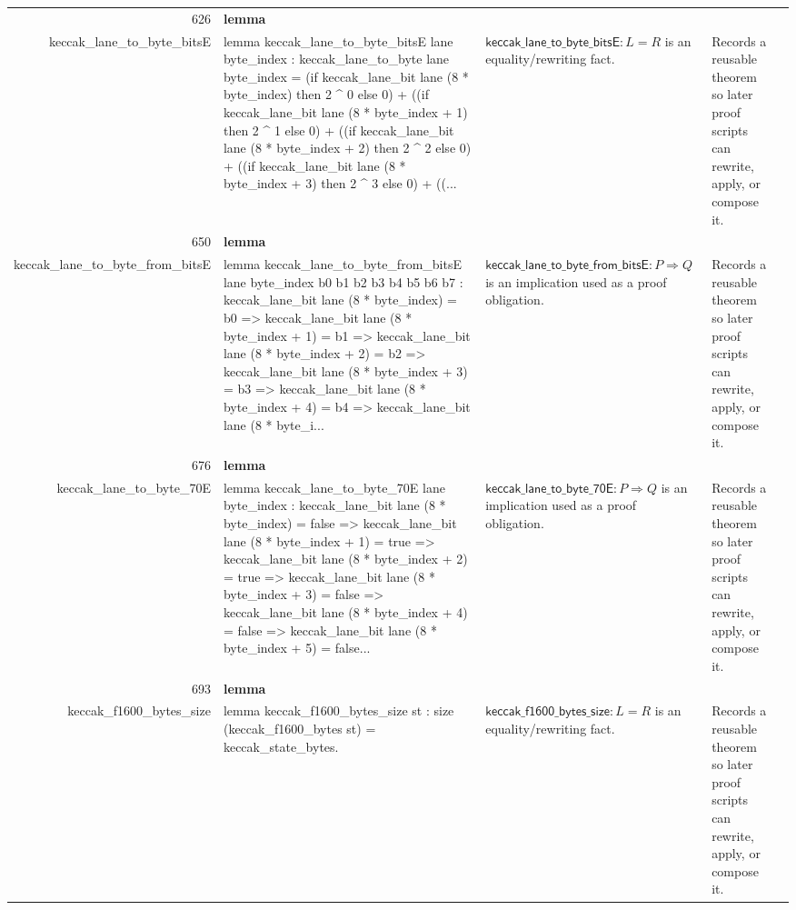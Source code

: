 \documentclass[10pt]{article}
\newcommand{\ec}[1]{\begingroup\ttfamily\scriptsize #1\endgroup}
\begin{document}
\begin{longtable}{r L{0.17\textwidth} L{0.26\textwidth} L{0.27\textwidth} L{0.20\textwidth}}
626 & \textbf{lemma}\\\ec{keccak\_lane\_to\_byte\_bitsE} & \ec{lemma keccak\_lane\_to\_byte\_bitsE lane byte\_index : keccak\_lane\_to\_byte lane byte\_index = (if keccak\_lane\_bit lane (8 * byte\_index) then 2 \textasciicircum{} 0 else 0) + ((if keccak\_lane\_bit lane (8 * byte\_index + 1) then 2 \textasciicircum{} 1 else 0) + ((if keccak\_lane\_bit lane (8 * byte\_index + 2) then 2 \textasciicircum{} 2 else 0) + ((if keccak\_lane\_bit lane (8 * byte\_index + 3) then 2 \textasciicircum{} 3 else 0) + ((...} & \(\mathsf{keccak\_lane\_to\_byte\_bitsE} : L = R\) is an equality/rewriting fact. & Records a reusable theorem so later proof scripts can rewrite, apply, or compose it. \\
650 & \textbf{lemma}\\\ec{keccak\_lane\_to\_byte\_from\_bitsE} & \ec{lemma keccak\_lane\_to\_byte\_from\_bitsE lane byte\_index b0 b1 b2 b3 b4 b5 b6 b7 : keccak\_lane\_bit lane (8 * byte\_index) = b0 => keccak\_lane\_bit lane (8 * byte\_index + 1) = b1 => keccak\_lane\_bit lane (8 * byte\_index + 2) = b2 => keccak\_lane\_bit lane (8 * byte\_index + 3) = b3 => keccak\_lane\_bit lane (8 * byte\_index + 4) = b4 => keccak\_lane\_bit lane (8 * byte\_i...} & \(\mathsf{keccak\_lane\_to\_byte\_from\_bitsE} : P \Rightarrow Q\) is an implication used as a proof obligation. & Records a reusable theorem so later proof scripts can rewrite, apply, or compose it. \\
676 & \textbf{lemma}\\\ec{keccak\_lane\_to\_byte\_70E} & \ec{lemma keccak\_lane\_to\_byte\_70E lane byte\_index : keccak\_lane\_bit lane (8 * byte\_index) = false => keccak\_lane\_bit lane (8 * byte\_index + 1) = true => keccak\_lane\_bit lane (8 * byte\_index + 2) = true => keccak\_lane\_bit lane (8 * byte\_index + 3) = false => keccak\_lane\_bit lane (8 * byte\_index + 4) = false => keccak\_lane\_bit lane (8 * byte\_index + 5) = false...} & \(\mathsf{keccak\_lane\_to\_byte\_70E} : P \Rightarrow Q\) is an implication used as a proof obligation. & Records a reusable theorem so later proof scripts can rewrite, apply, or compose it. \\
693 & \textbf{lemma}\\\ec{keccak\_f1600\_bytes\_size} & \ec{lemma keccak\_f1600\_bytes\_size st : size (keccak\_f1600\_bytes st) = keccak\_state\_bytes.} & \(\mathsf{keccak\_f1600\_bytes\_size} : L = R\) is an equality/rewriting fact. & Records a reusable theorem so later proof scripts can rewrite, apply, or compose it. \\
\bottomrule
\end{longtable}
\end{document}
